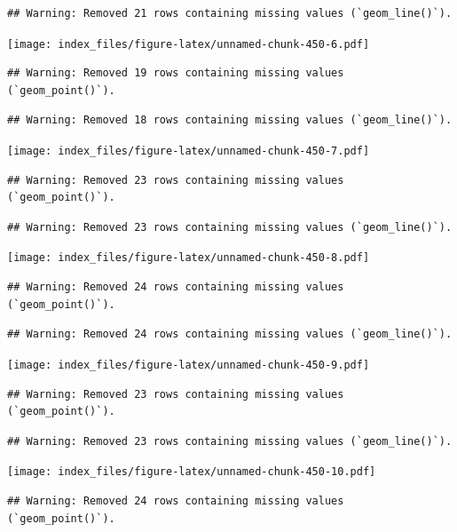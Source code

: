 \documentclass[
]{article}
\begin{document}
\begin{verbatim}
## Warning: Removed 21 rows containing missing values (`geom_line()`).
\end{verbatim}

\texttt{[image: index\_files/figure-latex/unnamed-chunk-450-6.pdf]}

\begin{verbatim}
## Warning: Removed 19 rows containing missing values (`geom_point()`).
\end{verbatim}

\begin{verbatim}
## Warning: Removed 18 rows containing missing values (`geom_line()`).
\end{verbatim}

\texttt{[image: index\_files/figure-latex/unnamed-chunk-450-7.pdf]}

\begin{verbatim}
## Warning: Removed 23 rows containing missing values (`geom_point()`).
\end{verbatim}

\begin{verbatim}
## Warning: Removed 23 rows containing missing values (`geom_line()`).
\end{verbatim}

\texttt{[image: index\_files/figure-latex/unnamed-chunk-450-8.pdf]}

\begin{verbatim}
## Warning: Removed 24 rows containing missing values (`geom_point()`).
\end{verbatim}

\begin{verbatim}
## Warning: Removed 24 rows containing missing values (`geom_line()`).
\end{verbatim}

\texttt{[image: index\_files/figure-latex/unnamed-chunk-450-9.pdf]}

\begin{verbatim}
## Warning: Removed 23 rows containing missing values (`geom_point()`).
\end{verbatim}

\begin{verbatim}
## Warning: Removed 23 rows containing missing values (`geom_line()`).
\end{verbatim}

\texttt{[image: index\_files/figure-latex/unnamed-chunk-450-10.pdf]}

\begin{verbatim}
## Warning: Removed 24 rows containing missing values (`geom_point()`).
\end{verbatim}
\end{document}
